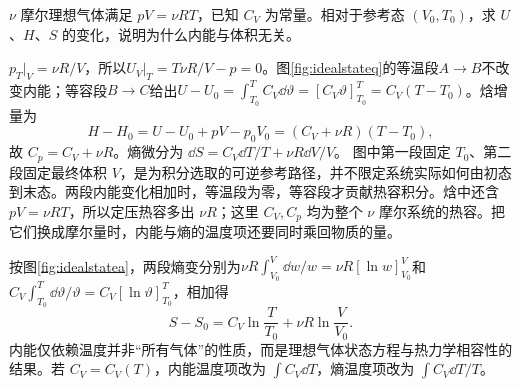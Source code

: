 
\begin{example}[理想气体的内能与熵]\label{ex:idealstate}
$\nu$ 摩尔理想气体满足 $pV=\nu RT$，已知 $C_V$ 为常量。相对于参考态 $(V_0,T_0)$，求 $U$、$H$、$S$ 的变化，说明为什么内能与体积无关。
\end{example}
\begin{solution}
$p_T|_V=\nu R/V$，所以$U_V|_T=T\nu R/V-p=0$。图\ref{fig:idealstateq}的等温段$A\to B$不改变内能；等容段$B\to C$给出$U-U_0=\int_{T_0}^TC_V\dd\vartheta=[C_V\vartheta]_{T_0}^T=C_V(T-T_0)$。焓增量为
\[
 H-H_0=U-U_0+pV-p_0V_0=(C_V+\nu R)(T-T_0),
\]
故 $C_p=C_V+\nu R$。熵微分为 $\dd S=C_V\dd T/T+\nu R\dd V/V$。
图中第一段固定 $T_0$、第二段固定最终体积 $V$，是为积分选取的可逆参考路径，并不限定系统实际如何由初态到末态。两段内能变化相加时，等温段为零，等容段才贡献热容积分。焓中还含 $pV=\nu RT$，所以定压热容多出 $\nu R$；这里 $C_V,C_p$ 均为整个 $\nu$ 摩尔系统的热容。把它们换成摩尔量时，内能与熵的温度项还要同时乘回物质的量。

按图\ref{fig:idealstatea}，两段熵变分别为$\nu R\int_{V_0}^V\dd w/w=\nu R[\ln w]_{V_0}^V$和$C_V\int_{T_0}^T\dd\vartheta/\vartheta=C_V[\ln\vartheta]_{T_0}^T$，相加得
\[
 S-S_0=C_V\ln\frac T{T_0}+\nu R\ln\frac V{V_0}.
\]
内能仅依赖温度并非“所有气体”的性质，而是理想气体状态方程与热力学相容性的结果。若 $C_V=C_V(T)$，内能温度项改为 $\int C_V\dd T$，熵温度项改为 $\int C_V\dd T/T$。
\end{solution}

